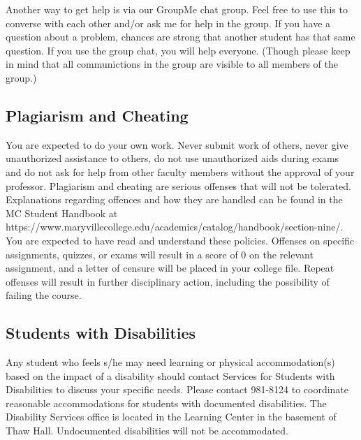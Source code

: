 \documentclass[11pt]{article}
\begin{document}
Another way to get help is via our GroupMe chat group.  Feel free to use this to converse with each other and/or ask me for help in the group.  If you have a question about a problem, chances are strong that another student has that same question.  If you use the group chat, you will help everyone. (Though please keep in mind that all communictions in the group are visible to all members of the group.) 

\subsection*{Plagiarism and Cheating}
You are expected to do your own work. Never submit work of others,
never give unauthorized assistance to others, do not use unauthorized aids during exams and do not ask for help from other
faculty members without the approval of your professor. Plagiarism and cheating are serious offenses that will not be
tolerated. Explanations regarding offences and how they are handled can be found in the MC Student Handbook at\newline
https://www.maryvillecollege.edu/academics/catalog/handbook/section-nine/.\newline
You are expected to have read and understand these policies. Offenses on specific assignments, quizzes, or exams will result
in a score of 0 on the relevant assignment, and a letter of censure will be placed in your college file. Repeat offenses will
result in further disciplinary action, including the possibility of failing the course.

\subsection*{Students with Disabilities}
Any student who feels s/he may need learning or physical
accommodation(s) based on the impact of a disability should contact Services for Students with Disabilities to discuss your
specific needs. Please contact 981-8124 to coordinate reasonable accommodations for students with documented
disabilities. The Disability Services office is located in the Learning Center in the basement of Thaw Hall. Undocumented
disabilities will not be accommodated.
\end{document}

